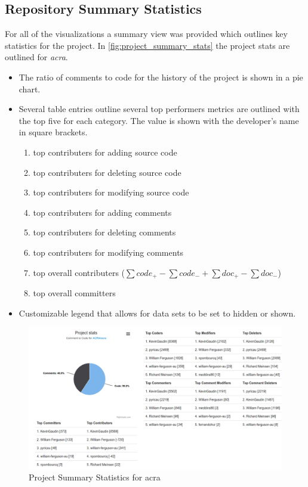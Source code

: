 \subsection{Repository Summary Statistics}

For all of the visualizations a summary view was provided which outlines key statistics for the project. In \autoref{fig:project_summary_stats} the project stats are outlined for \textit{acra}. 
\begin{itemize}
\item The ratio of comments to code for the history of the project is shown in a pie chart.
\item Several table entries outline several top performers metrics are outlined with the top five for each category. The value is shown with the developer's name in square brackets.
    \begin{enumerate}
    \item top contributers for adding source code
    \item top contributers for deleting source code
    \item top contributers for modifying source code
    \item top contributers for adding comments
    \item top contributers for deleting comments
    \item top contributers for modifying comments
    \item top overall contributers ($\sum code_{+} - \sum code_{-} + \sum doc_{+} - \sum doc_{-}$)
    \item top overall committers
    \end{enumerate}
\item Customizable legend that allows for data sets to be set to hidden or shown.
\end{itemize}

\begin{landscape}
\thispagestyle{empty}
 \begin{figure}
  \centering
        \includegraphics[width=1.5\textwidth]{images/table_visual}
    \caption{Project Summary Statistics for acra}
    \label{fig:project_summary_stats}
 \end{figure}
\end{landscape}
\pagestyle{plain}


